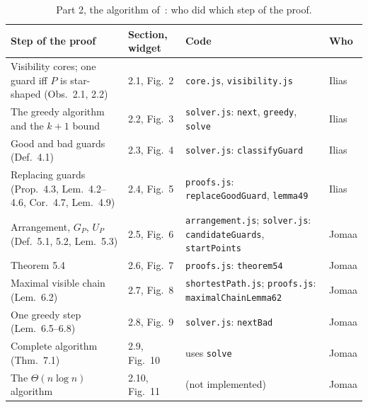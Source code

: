 \documentclass[11pt,a4paper]{article}
\theoremstyle{definition}
\theoremstyle{remark}
\begin{document}
\begin{table}[ht]
\centering\small
\begin{tabularx}{\linewidth}{@{}Y l Y l@{}}
\toprule
Step of the proof & Section, widget & Code & Who \\
\midrule
Visibility cores; one guard iff $P$ is star-shaped (Obs.~2.1, 2.2) & 2.1, Fig.~2 & \texttt{core.js}, \texttt{visibility.js} & Ilias \\
The greedy algorithm and the $k+1$ bound & 2.2, Fig.~3 & \texttt{solver.js}: \texttt{next}, \texttt{greedy}, \texttt{solve} & Ilias \\
Good and bad guards (Def.~4.1) & 2.3, Fig.~4 & \texttt{solver.js}: \texttt{classifyGuard} & Ilias \\
Replacing guards (Prop.~4.3, Lem.~4.2--4.6, Cor.~4.7, Lem.~4.9) & 2.4, Fig.~5 & \texttt{proofs.js}: \texttt{replaceGoodGuard}, \texttt{lemma49} & Ilias \\
Arrangement, $G_P$, $U_P$ (Def.~5.1, 5.2, Lem.~5.3) & 2.5, Fig.~6 & \texttt{arrangement.js}; \texttt{solver.js}: \texttt{candidateGuards}, \texttt{startPoints} & Jomaa \\
Theorem 5.4 & 2.6, Fig.~7 & \texttt{proofs.js}: \texttt{theorem54} & Jomaa \\
Maximal visible chain (Lem.~6.2) & 2.7, Fig.~8 & \texttt{shortestPath.js}; \texttt{proofs.js}: \texttt{maximalChainLemma62} & Jomaa \\
One greedy step (Lem.~6.5--6.8) & 2.8, Fig.~9 & \texttt{solver.js}: \texttt{nextBad} & Jomaa \\
Complete algorithm (Thm.~7.1) & 2.9, Fig.~10 & uses \texttt{solve} & Jomaa \\
The $\Theta(n\log n)$ algorithm~\cite{deBerg2026} & 2.10, Fig.~11 & (not implemented) & Jomaa \\
\bottomrule
\end{tabularx}
\caption{Part 2, the algorithm of~\cite{deBerg2025}: who did which step of the proof.}
\label{tab:who}
\end{table}
\end{document}
